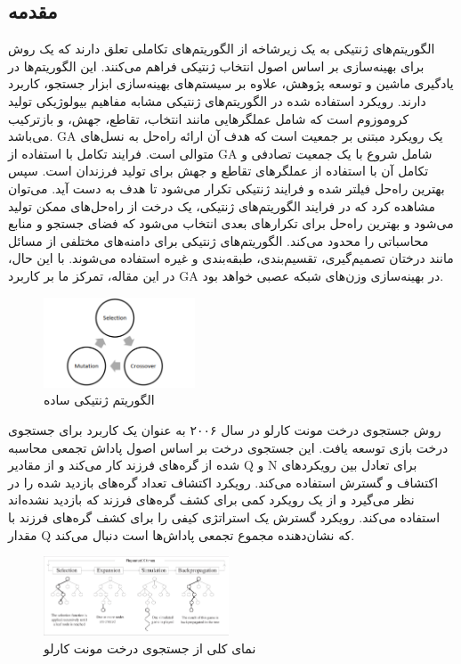 \documentclass[11pt]{article}
\begin{document}
	\begin{multicols}{2}
		
		\section{مقدمه}
		الگوریتم‌های ژنتیکی به یک زیرشاخه از الگوریتم‌های تکاملی تعلق دارند که یک روش برای بهینه‌سازی بر اساس اصول انتخاب ژنتیکی فراهم می‌کنند. این الگوریتم‌ها در یادگیری ماشین و توسعه پژوهش، علاوه بر سیستم‌های بهینه‌سازی ابزار جستجو، کاربرد دارند. رویکرد استفاده شده در الگوریتم‌های ژنتیکی مشابه مفاهیم بیولوژیکی تولید کروموزوم است که شامل عملگرهایی مانند انتخاب، تقاطع، جهش، و بازترکیب می‌باشد. GA یک رویکرد مبتنی بر جمعیت است که هدف آن ارائه راه‌حل به نسل‌های متوالی است. فرایند تکامل با استفاده از GA شامل شروع با یک جمعیت تصادفی و تکامل آن با استفاده از عملگرهای تقاطع و جهش برای تولید فرزندان است. سپس بهترین راه‌حل فیلتر شده و فرایند ژنتیکی تکرار می‌شود تا هدف به دست آید. می‌توان مشاهده کرد که در فرایند الگوریتم‌های ژنتیکی، یک درخت از راه‌حل‌های ممکن تولید می‌شود و بهترین راه‌حل برای تکرارهای بعدی انتخاب می‌شود که فضای جستجو و منابع محاسباتی را محدود می‌کند. الگوریتم‌های ژنتیکی برای دامنه‌های مختلفی از مسائل مانند درختان تصمیم‌گیری، تقسیم‌بندی، طبقه‌بندی و غیره استفاده می‌شوند. با این حال، در این مقاله، تمرکز ما بر کاربرد GA در بهینه‌سازی وزن‌های شبکه عصبی خواهد بود.
		\begin{figure}[H]
			\centering
			\includegraphics[width=0.4\textwidth,keepaspectratio]{1.png}
			\caption{الگوریتم ژنتیکی ساده}
			\label{fig:fig1}
		\end{figure}
		روش جستجوی درخت مونت کارلو در سال ۲۰۰۶ به عنوان یک کاربرد برای جستجوی درخت بازی توسعه یافت. این جستجوی درخت بر اساس اصول پاداش تجمعی محاسبه شده از گره‌های فرزند کار می‌کند و از مقادیر Q و N برای تعادل بین رویکردهای اکتشاف و گسترش استفاده می‌کند. رویکرد اکتشاف تعداد گره‌های بازدید شده را در نظر می‌گیرد و از یک رویکرد کمی برای کشف گره‌های فرزند که بازدید نشده‌اند استفاده می‌کند. رویکرد گسترش یک استراتژی کیفی را برای کشف گره‌های فرزند با مقدار Q که نشان‌دهنده مجموع تجمعی پاداش‌ها است دنبال می‌کند.
		\begin{figure}[H]
			\centering
			\includegraphics[width=0.49\textwidth,keepaspectratio]{2.png}
			\caption{نمای کلی از جستجوی درخت مونت کارلو}
			\label{fig:fig2}
		\end{figure}
		

\end{multicols}
\end{document}
